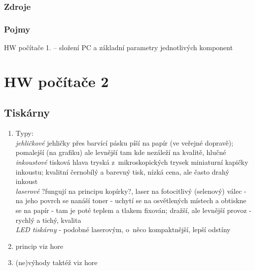 \documentclass[12pt]{article}
\begin{document}
\subsubsection{Zdroje}
\subsubsection{Pojmy}
HW počítače 1. – složení PC a základní parametry jednotlivých komponent

\section{HW počítače 2}
\subsection{Tiskárny}
\begin{enumerate}
\item Typy:\\
\emph{jehličkové} jehličky přes barvící pásku píší na papír (ve veřejné dopravě); pomalejší (na grafiku) ale levnější tam kde nezáleží na kvalitě, hlučné \\
\emph{inkoustové} tisková hlava tryská z~mikroskopických trysek miniaturní kapičky inkoustu; kvalitní černobílý a barevný tisk, nízká cena, ale často drahý inkoust \\
\emph{laserové}  ?fungují na principu kopírky?, laser na fotocitlivý (selenový) válec - na jeho povrch se nanáší toner - uchytí se na osvětlených místech a obtiskne se na papír - tam je poté teplem a tlakem fixován; dražší, ale levnější provoz - rychlý a tichý, kvalita\\
\emph{LED tiskárny} - podobné laserovým, o~něco kompaktnější, lepší odstíny
\item princip viz hore
\item (ne)výhody taktéž viz hore
\end{enumerate}
\end{document}
